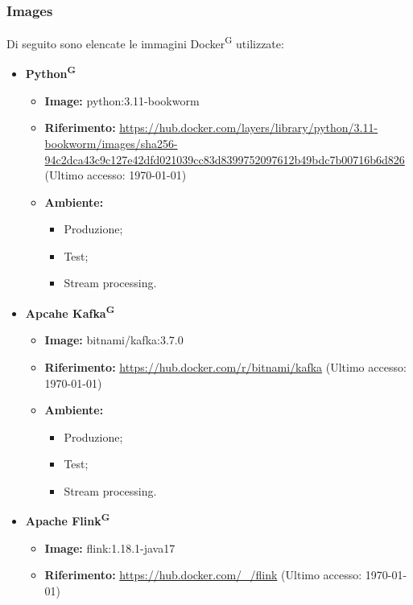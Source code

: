 \documentclass[8pt]{article}
\newcommand{\glossterm}[1]{#1\textsuperscript{G}} %
\begin{document}
\subsubsection{Images}
Di seguito sono elencate le immagini \glossterm{Docker} utilizzate:
\begin{itemize}
    \item \textbf{\glossterm{Python}}
    \begin{itemize}
        \item \textbf{Image:} python:3.11-bookworm
        \item \textbf{Riferimento:}  \href{https://hub.docker.com/layers/library/python/3.11-bookworm/images/sha256-94c2dca43c9c127e42dfd021039cc83d8399752097612b49bdc7b00716b6d826}{\color{myblue}https://hub.docker.com/layers/library/python/3.11-bookworm/images/sha256-94c2dca43c9c127e42dfd021039cc83d8399752097612b49bdc7b00716b6d826} (Ultimo accesso: \today)
        \item \textbf{Ambiente:}
        \begin{itemize}
            \item Produzione;
            \item Test;
            \item Stream processing.
        \end{itemize}
    \end{itemize}
    \clearpage
    \item \textbf{Apcahe \glossterm{Kafka}}
    \begin{itemize}
        \item \textbf{Image:} bitnami/kafka:3.7.0
        \item \textbf{Riferimento:}  \href{https://hub.docker.com/r/bitnami/kafka}{\color{myblue}https://hub.docker.com/r/bitnami/kafka} (Ultimo accesso: \today)
        \item \textbf{Ambiente:}
        \begin{itemize}
            \item Produzione;
            \item Test;
            \item Stream processing.
        \end{itemize}
    \end{itemize}
    \item \textbf{Apache \glossterm{Flink}}
    \begin{itemize}
        \item \textbf{Image:} flink:1.18.1-java17 
        \item \textbf{Riferimento:} \href{https://hub.docker.com/_/flink}{\color{myblue}https://hub.docker.com/\_/flink} (Ultimo accesso: \today)

\end{itemize}
\end{itemize}
\end{document}
